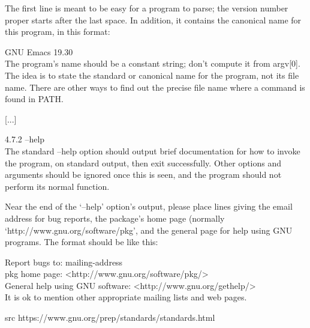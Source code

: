 {The first line is meant to be easy for a program to parse; the version number
proper starts after the last space. In addition, it contains the canonical name
for this program, in this format:\par

GNU Emacs 19.30 \\

The program’s name should be a constant string; don’t compute it from argv[0].
The idea is to state the standard or canonical name for the program, not its file
name. There are other ways to find out the precise file name where a command is
found in PATH.\par

[...]

4.7.2 --help \\

The standard --help option should output brief documentation for how to invoke
the program, on standard output, then exit successfully. Other options and
arguments should be ignored once this is seen, and the program should not perform
its normal function.\par

Near the end of the ‘--help’ option’s output, please place lines giving the email
address for bug reports, the package’s home page (normally ‘http://www.gnu.org/software/pkg’,
and the general page for help using GNU programs. The format should be like
this: \par

Report bugs to: mailing-address \\
pkg home page: <http://www.gnu.org/software/pkg/> \\
General help using GNU software: <http://www.gnu.org/gethelp/> \\

It is ok to mention other appropriate mailing lists and web pages.\par

}

src https://www.gnu.org/prep/standards/standards.html
